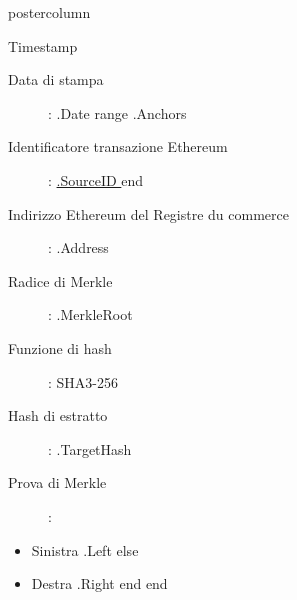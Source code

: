 \documentclass[roundedcorners=true, titleposition=center]{beamerthemeruhuisstijlposter}
\begin{document}
\begin{frame}
\begin{columns}
\begin{column}{0.95\textwidth}
\begin{beamercolorbox}[center, wd=\textwidth]{postercolumn}
\begin{minipage}[T]{0.95\textwidth}
    \hfill
\parbox[t][\columnheight]{\textwidth}{%

\begin{block}{Timestamp}
\begin{description}
\item [Data di stampa] :\linebreak
{{ .Date }}
{{ range .Anchors }}
\item [Identificatore transazione Ethereum] :\linebreak
\href{https://etherscan.io/tx/0x{{ .SourceID }} }{ {{.SourceID }} }
{{ end }}
\item[Indirizzo Ethereum del Registre du commerce
] :\linebreak
{{ .Address }}
\item[Radice di Merkle] :\linebreak
{{ .MerkleRoot }}
\item[Funzione di hash] : \linebreak
SHA3-256
\item[Hash di estratto] :\linebreak
{{ .TargetHash }}
\item[Prova di Merkle] :
\end{description}
\begin{itemize}
{{ range .Proof }}
    {{ if .Left }}
        \item Sinistra {{ .Left }}
    {{ else }}
        \item Destra {{ .Right }}
    {{ end }}
{{ end }}
\end{itemize}
\end{block}
}
\end{minipage}
\end{beamercolorbox}
\end{column}
\end{columns}
\end{frame}
\end{document}
